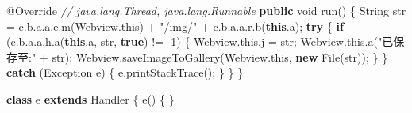 \documentclass[
]{article}
\newenvironment{Shaded}{}{}
\newcommand{\AttributeTok}[1]{\textcolor[rgb]{0.49,0.56,0.16}{#1}}
\newcommand{\BuiltInTok}[1]{\textcolor[rgb]{0.00,0.50,0.00}{#1}}
\newcommand{\CommentTok}[1]{\textcolor[rgb]{0.38,0.63,0.69}{\textit{#1}}}
\newcommand{\ControlFlowTok}[1]{\textcolor[rgb]{0.00,0.44,0.13}{\textbf{#1}}}
\newcommand{\DataTypeTok}[1]{\textcolor[rgb]{0.56,0.13,0.00}{#1}}
\newcommand{\DecValTok}[1]{\textcolor[rgb]{0.25,0.63,0.44}{#1}}
\newcommand{\FunctionTok}[1]{\textcolor[rgb]{0.02,0.16,0.49}{#1}}
\newcommand{\KeywordTok}[1]{\textcolor[rgb]{0.00,0.44,0.13}{\textbf{#1}}}
\newcommand{\NormalTok}[1]{#1}
\newcommand{\OperatorTok}[1]{\textcolor[rgb]{0.40,0.40,0.40}{#1}}
\newcommand{\StringTok}[1]{\textcolor[rgb]{0.25,0.44,0.63}{#1}}
\begin{document}
\begin{Shaded}
\begin{Highlighting}[]
        \AttributeTok{@Override} \CommentTok{// java.lang.Thread, java.lang.Runnable}
        \KeywordTok{public} \DataTypeTok{void} \FunctionTok{run}\OperatorTok{()} \OperatorTok{\{}
            \BuiltInTok{String}\NormalTok{ str }\OperatorTok{=}\NormalTok{ c}\OperatorTok{.}\FunctionTok{b}\OperatorTok{.}\FunctionTok{a}\OperatorTok{.}\FunctionTok{a}\OperatorTok{.}\FunctionTok{e}\OperatorTok{.}\FunctionTok{m}\OperatorTok{(}\NormalTok{Webview}\OperatorTok{.}\FunctionTok{this}\OperatorTok{)} \OperatorTok{+} \StringTok{"/img/"} \OperatorTok{+}\NormalTok{ c}\OperatorTok{.}\FunctionTok{b}\OperatorTok{.}\FunctionTok{a}\OperatorTok{.}\FunctionTok{a}\OperatorTok{.}\FunctionTok{r}\OperatorTok{.}\FunctionTok{b}\OperatorTok{(}\KeywordTok{this}\OperatorTok{.}\FunctionTok{a}\OperatorTok{);}
            \ControlFlowTok{try} \OperatorTok{\{}
                \ControlFlowTok{if} \OperatorTok{(}\NormalTok{c}\OperatorTok{.}\FunctionTok{b}\OperatorTok{.}\FunctionTok{a}\OperatorTok{.}\FunctionTok{a}\OperatorTok{.}\FunctionTok{h}\OperatorTok{.}\FunctionTok{a}\OperatorTok{(}\KeywordTok{this}\OperatorTok{.}\FunctionTok{a}\OperatorTok{,}\NormalTok{ str}\OperatorTok{,} \KeywordTok{true}\OperatorTok{)} \OperatorTok{!=} \OperatorTok{{-}}\DecValTok{1}\OperatorTok{)} \OperatorTok{\{}
\NormalTok{                    Webview}\OperatorTok{.}\FunctionTok{this}\OperatorTok{.}\FunctionTok{j} \OperatorTok{=}\NormalTok{ str}\OperatorTok{;}
\NormalTok{                    Webview}\OperatorTok{.}\FunctionTok{this}\OperatorTok{.}\FunctionTok{a}\OperatorTok{(}\StringTok{"已保存至:"} \OperatorTok{+}\NormalTok{ str}\OperatorTok{);}
\NormalTok{                    Webview}\OperatorTok{.}\FunctionTok{saveImageToGallery}\OperatorTok{(}\NormalTok{Webview}\OperatorTok{.}\FunctionTok{this}\OperatorTok{,} \KeywordTok{new} \BuiltInTok{File}\OperatorTok{(}\NormalTok{str}\OperatorTok{));}
                \OperatorTok{\}}
            \OperatorTok{\}} \ControlFlowTok{catch} \OperatorTok{(}\BuiltInTok{Exception}\NormalTok{ e}\OperatorTok{)} \OperatorTok{\{}
\NormalTok{                e}\OperatorTok{.}\FunctionTok{printStackTrace}\OperatorTok{();}
            \OperatorTok{\}}
        \OperatorTok{\}}
    \OperatorTok{\}}

    \KeywordTok{class}\NormalTok{ e }\KeywordTok{extends} \BuiltInTok{Handler} \OperatorTok{\{}
        \FunctionTok{e}\OperatorTok{()} \OperatorTok{\{}
        \OperatorTok{\}}


\end{Highlighting}
\end{Shaded}
\end{document}
